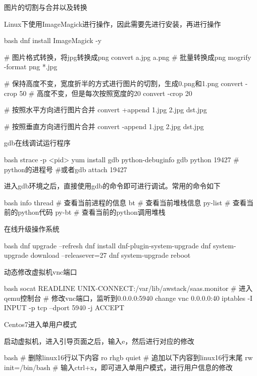 \begin{outline}[enumerate]
\1 图片的切割与合并以及转换

Linux下使用ImageMagick进行操作，因此需要先进行安装，再进行操作
\begin{code-block}{bash}
dnf install ImageMagick -y

# 图片格式转换，将jpg转换成png
convert a.jpg a.png
# 批量转换成png
mogrify -format png *.jpg

# 保持高度不变，宽度折半的方式进行图片的切割，生成0.png和1.png
convert -crop 50%
# 高度不变，但是每次按照宽度的20%
convert -crop 20%

# 按照水平方向进行图片合并
convert +append 1.jpg 2.jpg dst.jpg

# 按照垂直方向进行图片合并
convert -append 1.jpg 2.jpg dst.jpg
\end{code-block}

\1 gdb在线调试运行程序

\begin{code-block}{bash}
strace -p <pid>
yum install gdb python-debuginfo
gdb python 19427 # python的进程号
#或者gdb attach 19427
\end{code-block}

进入gdb环境之后，直接使用gdb的命令即可进行调试。常用的命令如下
\begin{code-block}{bash}
info thread # 查看当前进程的信息
bt          # 查看当前堆栈信息
py-list     # 查看当前的python代码
py-bt       # 查看当前的python调用堆栈
\end{code-block}

\1 在线升级操作系统

\begin{code-block}{bash}
dnf upgrade --refresh
dnf install dnf-plugin-system-upgrade
dnf system-upgrade download --releasever=27
dnf system-upgrade reboot
\end{code-block}

\1 动态修改虚拟机vnc端口

\begin{code-block}{bash}
socat READLINE UNIX-CONNECT:/var/lib/awstack/saas.monitor
# 进入qemu控制台
# 修改vnc端口，监听到0.0.0.0:5940
change vnc 0.0.0.0:40
iptables -I INPUT -p tcp --dport 5940 -j ACCEPT
\end{code-block}

\1 Centos7进入单用户模式

启动虚拟机，进入引导页面之后，输入e，然后进行对应的修改
\begin{code-block}{bash}
# 删除linux16行以下内容
ro rhgb quiet
# 追加以下内容到linux16行末尾
rw init=/bin/bash
# 输入ctrl+x，即可进入单用户模式，进行用户信息的修改
\end{code-block}


\end{outline}
